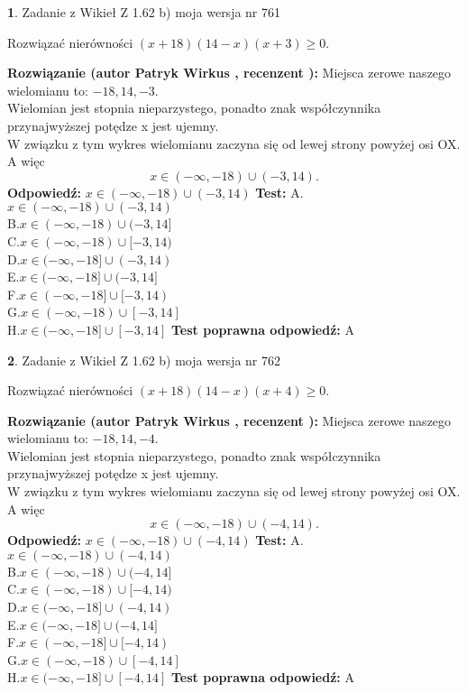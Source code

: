 \documentclass[12pt, a4paper]{article}
\theoremstyle{definition} %
\newtheorem{zad}{}
\newcommand{\zadStart}[1]{\begin{zad}#1\newline}
\newcommand{\zadStop}{\end{zad}}
\newcommand{\rozwStart}[2]{\noindent \textbf{Rozwiązanie (autor #1 , recenzent #2): }\newline}
\newcommand{\rozwStop}{\newline}
\newcommand{\odpStart}{\noindent \textbf{Odpowiedź:}\newline}
\newcommand{\odpStop}{\newline}
\newcommand{\testStart}{\noindent \textbf{Test:}\newline}
\newcommand{\testStop}{\newline}
\newcommand{\kluczStart}{\noindent \textbf{Test poprawna odpowiedź:}\newline}
\newcommand{\kluczStop}{\newline}
\begin{document}
\zadStart{Zadanie z Wikieł Z 1.62 b) moja wersja nr 761}

Rozwiązać nierówności $(x+18)(14-x)(x+3)\ge0$.
\zadStop
\rozwStart{Patryk Wirkus}{}
Miejsca zerowe naszego wielomianu to: $-18, 14, -3$.\\
Wielomian jest stopnia nieparzystego, ponadto znak współczynnika przy\linebreak najwyższej potędze x jest ujemny.\\ W związku z tym wykres wielomianu zaczyna się od lewej strony powyżej osi OX. A więc $$x \in (-\infty,-18) \cup (-3,14).$$
\rozwStop
\odpStart
$x \in (-\infty,-18) \cup (-3,14)$
\odpStop
\testStart
A.$x \in (-\infty,-18) \cup (-3,14)$\\
B.$x \in (-\infty,-18) \cup (-3,14]$\\
C.$x \in (-\infty,-18) \cup [-3,14)$\\
D.$x \in (-\infty,-18] \cup (-3,14)$\\
E.$x \in (-\infty,-18] \cup (-3,14]$\\
F.$x \in (-\infty,-18] \cup [-3,14)$\\
G.$x \in (-\infty,-18) \cup [-3,14]$\\
H.$x \in (-\infty,-18] \cup [-3,14]$
\testStop
\kluczStart
A
\kluczStop



\zadStart{Zadanie z Wikieł Z 1.62 b) moja wersja nr 762}

Rozwiązać nierówności $(x+18)(14-x)(x+4)\ge0$.
\zadStop
\rozwStart{Patryk Wirkus}{}
Miejsca zerowe naszego wielomianu to: $-18, 14, -4$.\\
Wielomian jest stopnia nieparzystego, ponadto znak współczynnika przy\linebreak najwyższej potędze x jest ujemny.\\ W związku z tym wykres wielomianu zaczyna się od lewej strony powyżej osi OX. A więc $$x \in (-\infty,-18) \cup (-4,14).$$
\rozwStop
\odpStart
$x \in (-\infty,-18) \cup (-4,14)$
\odpStop
\testStart
A.$x \in (-\infty,-18) \cup (-4,14)$\\
B.$x \in (-\infty,-18) \cup (-4,14]$\\
C.$x \in (-\infty,-18) \cup [-4,14)$\\
D.$x \in (-\infty,-18] \cup (-4,14)$\\
E.$x \in (-\infty,-18] \cup (-4,14]$\\
F.$x \in (-\infty,-18] \cup [-4,14)$\\
G.$x \in (-\infty,-18) \cup [-4,14]$\\
H.$x \in (-\infty,-18] \cup [-4,14]$
\testStop
\kluczStart
A
\kluczStop
\end{document}

